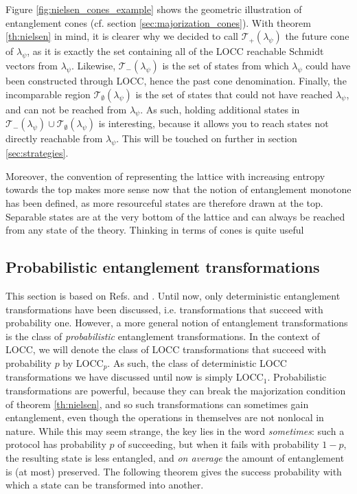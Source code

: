 Figure \ref{fig:nielsen_cones_example} shows the geometric illustration of entanglement cones (cf. section \ref{sec:majorization_cones}). With theorem \ref{th:nielsen} in mind, it is clearer why we decided to call $\mathcal{T}_+ (\lambda_\psi)$ the future cone of $\lambda_\psi$, as it is exactly the set containing all of the LOCC reachable Schmidt vectors from $\lambda_\psi$. Likewise, $\mathcal{T}_- (\lambda_\psi)$ is the set of states from which $\lambda_\psi$ could have been constructed through LOCC, hence the past cone denomination. Finally, the incomparable region $\mathcal{T}_\emptyset (\lambda_\psi)$ is the set of states that could not have reached $\lambda_\psi$, and can not be reached from $\lambda_\psi$.  As such, holding additional states in $\mathcal{T}_- (\lambda_\psi) \cup \mathcal{T}_\emptyset (\lambda_\psi)$ is interesting, because it allows you to reach states not directly reachable from $\lambda_\psi$. This will be touched on further in section \ref{sec:strategies}. 

Moreover, the convention of representing the lattice with increasing entropy towards the top makes more sense now that the notion of entanglement monotone has been defined, as more resourceful states are therefore drawn at the top. Separable states are at the very bottom of the lattice and can always be reached from any state of the theory. Thinking in terms of cones is quite useful 




\subsection{Probabilistic entanglement transformations} \label{sec:vidal}

This section is based on Refs. \cite{vidal_entanglement_1999} and \cite{nielsen_majorization_2001}. Until now, only deterministic entanglement transformations have been discussed, i.e. transformations that succeed with probability one. However, a more general notion of entanglement transformations is the class of \textit{probabilistic} entanglement transformations. In the context of LOCC, we will denote the class of LOCC transformations that succeed with probability $p$ by LOCC$_p$. As such, the class of deterministic LOCC transformations we have discussed until now is simply LOCC$_1$. Probabilistic transformations are powerful, because they can break the majorization condition of theorem \ref{th:nielsen}, and so such transformations can sometimes gain entanglement, even though the operations in themselves are not nonlocal in nature. While this may seem strange, the key lies in the word \textit{sometimes}: such a protocol has probability $p$ of succeeding, but when it fails with probability $1-p$, the resulting state is less entangled, and \textit{on average} the amount of entanglement is (at most) preserved. The following theorem gives the success probability with which a state can be transformed into another.

